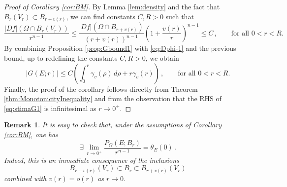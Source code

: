 \documentclass[a4paper,reqno,11pt]{amsart}
\newtheorem{remark}[theorem]{Remark}
\newcommand{\pr}{P_{\Omega}}
\begin{document}
\begin{proof}[Proof of Corollary \ref{cor:BM}]
By Lemma \ref{lem:density} and the fact that $B_{r}(V_{r}) \subset B_{r+v(r)}$, we can find constants $C,R>0$ such that
\begin{equation*}
\dfrac{|Df|(\Omega \cap B_{r}(V_{r}))}{r^{n-1}} \leq \dfrac{|Df|(\Omega \cap B_{r + v(r)})}{(r + v(r))^{n-1}} \left( 1 + \dfrac{v(r)}{r} \right)^{n-1} \leq C\,,\qquad \text{for all $0<r<R$.}
\end{equation*}
By combining Proposition \ref{prop:Gbound1} with \eqref{eq:Dphi-1} and the previous bound, up to redefining the constants $C,R>0$, we obtain 
\begin{equation}\label{eq:stimaG1}
|G(E;r)| \le C\left(\int_{0}^{r}\gamma_{v}(\rho)\, d\rho + r\gamma_{v}(r)\right)\,,\qquad \text{for all $0<r<R$.}
\end{equation}
Finally, the proof of the corollary follows directly from Theorem \ref{thm:MonotonicityInequality} and from the observation that the RHS of \eqref{eq:stimaG1} is infinitesimal as $r\to 0^{+}$. 
\end{proof}

\begin{remark}\label{rem:perdens-offcentric}
It is easy to check that, under the assumptions of Corollary \ref{cor:BM}, one has
\begin{equation*}
\exists\, \lim_{r\to 0^{+}}\frac{\pr(E;B_{r})}{r^{n-1}} = \theta_{E}(0)\,.
\end{equation*}
Indeed, this is an immediate consequence of the inclusions
\[
B_{r-v(r)}(V_{r}) \subset B_{r} \subset B_{r+v(r)}(V_{r})
\]
combined with $v(r) = o(r)$ as $r\to 0$.
\end{remark}
\end{document}
